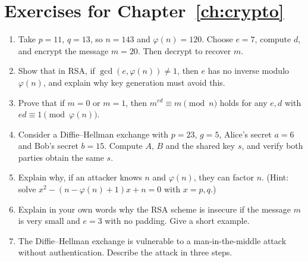 \section*{Exercises for Chapter~\ref{ch:crypto}}

\begin{enumerate}
  \item Take $p=11$, $q=13$, so $n=143$ and $\varphi(n)=120$. Choose $e=7$, compute $d$, and encrypt the message $m=20$. Then decrypt to recover $m$.
  \item Show that in RSA, if $\gcd(e,\varphi(n))\neq 1$, then $e$ has no inverse modulo $\varphi(n)$, and explain why key generation must avoid this.
  \item Prove that if $m=0$ or $m=1$, then $m^{ed}\equiv m\pmod n$ holds for any $e,d$ with $ed\equiv 1\pmod{\varphi(n)}$.
  \item Consider a Diffie--Hellman exchange with $p=23$, $g=5$, Alice's secret $a=6$ and Bob's secret $b=15$. Compute $A$, $B$ and the shared key $s$, and verify both parties obtain the same $s$.
  \item Explain why, if an attacker knows $n$ and $\varphi(n)$, they can factor $n$. (Hint: solve $x^2-(n-\varphi(n)+1)x+n=0$ with $x=p,q$.)
  \item Explain in your own words why the RSA scheme is insecure if the message $m$ is very small and $e=3$ with no padding. Give a short example.
  \item The Diffie--Hellman exchange is vulnerable to a man-in-the-middle attack without authentication. Describe the attack in three steps.
\end{enumerate}
